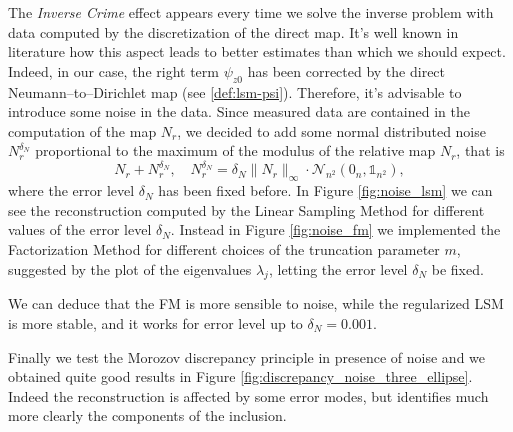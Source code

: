 \documentclass[10pt, a4paper, twoside, openright]{book}
\theoremstyle{definition}
\theoremstyle{plain}
\theoremstyle{plain}
\theoremstyle{plain}
\theoremstyle{plain}
\theoremstyle{plain}
\theoremstyle{plain}
\theoremstyle{plain}
\theoremstyle{plain}
\begin{document}
The \emph{Inverse Crime} effect appears every time we solve the inverse problem with data computed 
by the discretization of the direct map. It's well known in literature how this aspect leads to 
better estimates than which we should expect. Indeed, in our case, the right term $\psi_{z0}$ 
has been corrected by the direct Neumann--to--Dirichlet map (see \eqref{def:lsm-psi}). Therefore, it's advisable to 
introduce some noise in the data.
Since measured data are contained in the computation of the map $N_r$, we decided to add 
some normal distributed noise $N_r^{\delta_N}$ proportional to the maximum of the modulus of 
the relative map $N_r$, that is
\begin{equation}
 N_r + N_r^{\delta_N}, \quad N_r^{\delta_N}=\delta_N\|N_r\|_{\infty}
 \cdot \mathcal{N}_{n^2}(0_n,\mathbb{1}_{n^2}),
\end{equation}
where the error level $\delta_N$ has been fixed before.
In Figure \ref{fig:noise_lsm} we can see the reconstruction computed by the Linear 
Sampling Method for different values of the error level $\delta_N$. 
Instead in Figure \ref{fig:noise_fm} we implemented the Factorization Method 
for different choices of the truncation parameter $m$, suggested by the plot of the eigenvalues
$\lambda_j$, letting the error level $\delta_N$ be fixed.
\par
We can deduce that the FM is more sensible to noise, while the regularized LSM is more stable, 
and it works for error level up to $\delta_N=0.001$.

Finally we test the Morozov discrepancy principle in presence of noise and 
we obtained quite good results in Figure 
\ref{fig:discrepancy_noise_three_ellipse}.
Indeed the reconstruction is affected by some error modes, but identifies much more
clearly the components of the inclusion.
\end{document}
